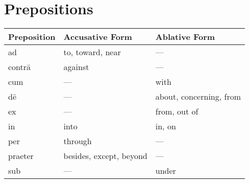 \section{Prepositions}

\setlength\columnseprule{.4pt}
\renewcommand{\arraystretch}{2.5}

\vspace{3em}
\begin{tabu} to \linewidth{X[l]X[l]X[l]}\toprule
  Preposition & Accusative Form & Ablative Form \\\midrule
  ad        & to, toward, near        & --- \\
  contr\=a  & against                 & --- \\
  cum       & ---                     & with \\
  d\=e      & ---                     & about, concerning, from \\
  ex        & ---                     & from, out of \\
  in        & into                    & in, on \\
  per       & through                 & --- \\
  praeter   & besides, except, beyond & --- \\
  sub       & ---                     & under \\
\end{tabu}
